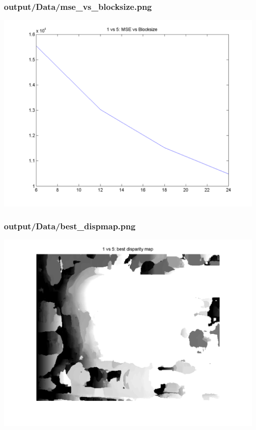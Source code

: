 \subsubsection{output/Data/mse\_vs\_blocksize.png}
    \includegraphics[scale=0.5]{output/Data/mse_vs_blocksize.png}

\subsubsection{output/Data/best\_dispmap.png}
    \includegraphics[scale=0.5]{output/Data/best_dispmap.png}

